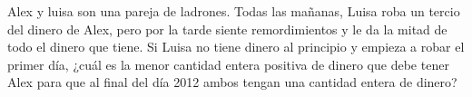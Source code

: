 Alex y luisa son una pareja de ladrones. Todas las mañanas, Luisa roba un tercio del dinero de Alex, pero por la tarde siente remordimientos y le da la mitad de todo el dinero que tiene. Si Luisa no tiene dinero al principio y empieza a robar el primer día, ¿cuál es la menor cantidad entera positiva de dinero que debe tener Alex para que al final del día 2012 ambos tengan una cantidad entera de dinero?

